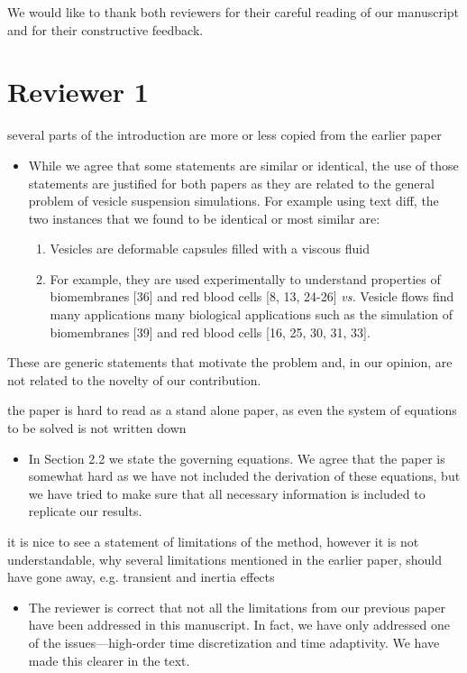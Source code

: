 \documentclass[12pt]{article}
\newcommand{\comment}[1]{{\color{blue} #1}}
\begin{document}
We would like to thank both reviewers for their careful reading of our
manuscript and for their constructive feedback. 

\section*{Reviewer 1}

\comment{several parts of the introduction are more or less copied from
the earlier paper}

\begin{itemize}
  \item While we agree that some statements are similar or identical,
  the use of those statements are justified for both papers as they are
  related to the general problem of vesicle suspension simulations. For
  example using text diff,  the two instances that we found to be
  identical or most similar are: 
  \begin{enumerate}
    \item Vesicles are deformable capsules filled with a viscous fluid
    \item For example, they are used experimentally to understand
    properties of biomembranes [36] and red blood cells [8, 13,
    24-26] \emph{vs.} Vesicle flows find many applications many biological
    applications such as the simulation of biomembranes [39] and red
    blood cells [16, 25, 30, 31, 33].
  \end{enumerate}
\end{itemize}
These are generic statements that motivate the problem and, in our
opinion, are not related to the novelty of our contribution.

\comment{the paper is hard to read as a stand alone paper, as even the
system of equations to be solved is not written down}
\begin{itemize}
  \item In Section 2.2 we state the governing equations. We agree that
    the paper is somewhat hard as we have not included the derivation
    of these equations, but we have tried to make sure that all
    necessary information is included to replicate our results.
\end{itemize}

\comment{it is nice to see a statement of limitations of the method,
however it is not understandable, why several limitations mentioned in
the earlier paper, should have gone away, e.g.  transient and inertia
effects}

\begin{itemize}
  \item The reviewer is correct that not all the limitations from our
    previous paper have been addressed in this manuscript.  In fact,
    we have only addressed one of the issues---high-order time
    discretization and time adaptivity. We have made this clearer in
    the text.
\end{itemize}
\end{document}
